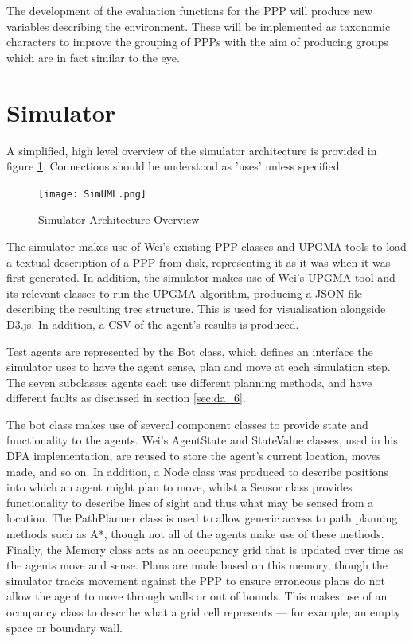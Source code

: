 \documentclass[authoryearcitations]{UoYCSproject}
\begin{document}
The development of the evaluation functions for the PPP will produce new variables describing the environment. These will be implemented as taxonomic characters to improve the grouping of PPPs with the aim of producing groups which are in fact similar to the eye.

\section{Simulator}
\label{sec:da_4}
A simplified, high level overview of the simulator architecture is provided in figure \ref{fig:sim_uml}. Connections should be understood as 'uses' unless specified.

\begin{figure}
\graphicspath{ {DesignImpPics/} }
\texttt{[image: SimUML.png]}
\caption{Simulator Architecture Overview}
\label{fig:sim_uml}
\end{figure}

The simulator makes use of Wei's existing PPP classes and UPGMA tools to load a textual description of a PPP from disk, representing it as it was when it was first generated. In addition, the simulator makes use of Wei's UPGMA tool and its relevant classes to run the UPGMA algorithm, producing a JSON file describing the resulting tree structure. This is used for visualisation alongside D3.js. In addition, a CSV of the agent's results is produced.

Test agents are represented by the Bot class, which defines an interface the simulator uses to have the agent sense, plan and move at each simulation step. The seven subclasses agents each use different planning methods, and have different faults as discussed in section \ref{sec:da_6}.

The bot class makes use of several component classes to provide state and functionality to the agents. Wei's AgentState and StateValue classes, used in his DPA implementation, are reused to store the agent's current location, moves made, and so on. In addition, a Node class was produced to describe positions into which an agent might plan to move, whilst a Sensor class provides functionality to describe lines of sight and thus what may be sensed from a location. The PathPlanner class is used to allow generic access to path planning methods such as A*, though not all of the agents make use of these methods. Finally, the Memory class acts as an occupancy grid that is updated over time as the agents move and sense. Plans are made based on this memory, though the simulator tracks movement against the PPP to ensure erroneous plans do not allow the agent to move through walls or out of bounds. This makes use of an occupancy class to describe what a grid cell represents --- for example, an empty space or boundary wall.
\end{document}

